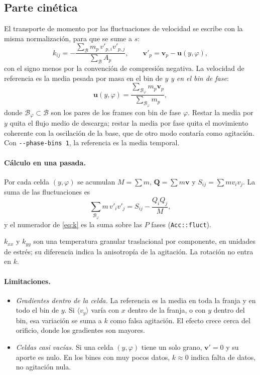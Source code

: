 \documentclass[11pt,a4paper]{article}
\newcommand{\vect}[1]{\mathbf{#1}}
\newcommand{\vv}{\vect{v}}
\newcommand{\code}[1]{\texttt{#1}}
\newcommand{\ave}[1]{\langle #1 \rangle}
\begin{document}
\subsection{Parte cinética}
\label{sec:cinetica}

El transporte de momento por las fluctuaciones de velocidad se escribe con
la misma normalización, para que se sume a $s$:
\begin{equation}
  k_{ij} = -\frac{\sum_{\mathcal{B}} m_p \, v'_{p,i} v'_{p,j}}
                 {\sum_{\mathcal{B}} A_p},
  \qquad
  \vv'_p = \vv_p - \vect{u}(y, \varphi),
  \label{eq:k}
\end{equation}
con el signo menos por la convención de compresión negativa. La velocidad
de referencia es la media pesada por masa en el bin de $y$ \emph{y en el
bin de fase}:
\begin{equation}
  \vect{u}(y, \varphi) = \frac{\sum_{\mathcal{B}_\varphi} m_p \vv_p}
                              {\sum_{\mathcal{B}_\varphi} m_p},
\end{equation}
donde $\mathcal{B}_\varphi \subset \mathcal{B}$ son los pares de los
frames con bin de fase $\varphi$. Restar la media por $y$ quita el flujo
medio de descarga; restar la media por fase quita el movimiento coherente
con la oscilación de la base, que de otro modo contaría como agitación.
Con \code{-{}-phase-bins 1}, la referencia es la media temporal.

\paragraph{Cálculo en una pasada.} Por cada celda $(y, \varphi)$ se
acumulan $M = \sum m$, $\vect{Q} = \sum m \vv$ y
$S_{ij} = \sum m v_i v_j$. La suma de las fluctuaciones es
\begin{equation}
  \sum_{\mathcal{B}_\varphi} m \, v'_i v'_j = S_{ij} - \frac{Q_i Q_j}{M},
\end{equation}
y el numerador de \eqref{eq:k} es la suma sobre las $P$ fases
(\code{Acc::fluct}).

$k_{xx}$ y $k_{yy}$ son una temperatura granular traslacional por
componente, en unidades de estrés; su diferencia indica la anisotropía de
la agitación. La rotación no entra en $k$.

\paragraph{Limitaciones.}
\begin{itemize}
  \item \emph{Gradientes dentro de la celda.} La referencia es la media en
    toda la franja y en todo el bin de $y$. Si $\ave{v_y}$ varía con $x$
    dentro de la franja, o con $y$ dentro del bin, esa variación se suma a
    $k$ como falsa agitación. El efecto crece cerca del orificio, donde los
    gradientes son mayores.
  \item \emph{Celdas casi vacías.} Si una celda $(y, \varphi)$ tiene un
    solo grano, $\vv' = 0$ y su aporte es nulo. En los bines con muy pocos
    datos, $k \approx 0$ indica falta de datos, no agitación nula.
\end{itemize}
\end{document}
